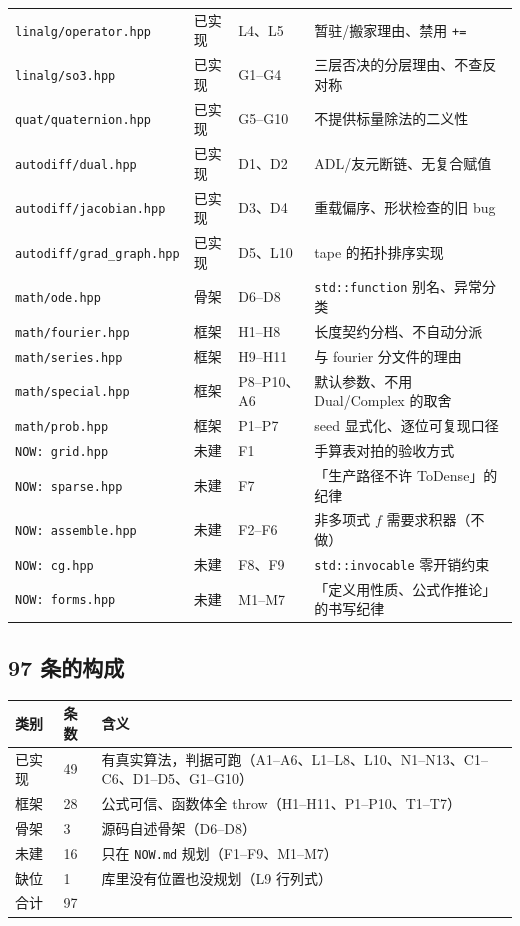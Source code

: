 \begin{longtable}{L{4.8cm}L{1.2cm}L{2.7cm}L{5.2cm}}
\texttt{linalg/operator.hpp} & 已实现 & L4、L5 & 暂驻/搬家理由、禁用 \texttt{+=} \\
\texttt{linalg/so3.hpp} & 已实现 & G1--G4 & 三层否决的分层理由、不查反对称 \\
\texttt{quat/quaternion.hpp} & 已实现 & G5--G10 & 不提供标量除法的二义性 \\
\texttt{autodiff/dual.hpp} & 已实现 & D1、D2 & ADL/友元断链、无复合赋值 \\
\texttt{autodiff/jacobian.hpp} & 已实现 & D3、D4 & 重载偏序、形状检查的旧 bug \\
\texttt{autodiff/grad\_graph.hpp} & 已实现 & D5、L10 & tape 的拓扑排序实现 \\
\texttt{math/ode.hpp} & 骨架 & D6--D8 & \texttt{std::function} 别名、异常分类 \\
\texttt{math/fourier.hpp} & 框架 & H1--H8 & 长度契约分档、不自动分派 \\
\texttt{math/series.hpp} & 框架 & H9--H11 & 与 fourier 分文件的理由 \\
\texttt{math/special.hpp} & 框架 & P8--P10、A6 & 默认参数、不用 Dual/Complex 的取舍 \\
\texttt{math/prob.hpp} & 框架 & P1--P7 & seed 显式化、逐位可复现口径 \\
\texttt{NOW: grid.hpp} & 未建 & F1 & 手算表对拍的验收方式 \\
\texttt{NOW: sparse.hpp} & 未建 & F7 & 「生产路径不许 ToDense」的纪律 \\
\texttt{NOW: assemble.hpp} & 未建 & F2--F6 & 非多项式 $f$ 需要求积器（不做） \\
\texttt{NOW: cg.hpp} & 未建 & F8、F9 & \texttt{std::invocable} 零开销约束 \\
\texttt{NOW: forms.hpp} & 未建 & M1--M7 & 「定义用性质、公式作推论」的书写纪律 \\
\bottomrule
\end{longtable}

\subsection{97 条的构成}

\begin{center}
\begin{tabular}{L{3.0cm}L{2.0cm}L{9.0cm}}
\toprule
类别 & 条数 & 含义 \\
\midrule
已实现 & 49 & 有真实算法，判据可跑（A1--A6、L1--L8、L10、N1--N13、C1--C6、D1--D5、G1--G10）\\
框架 & 28 & 公式可信、函数体全 throw（H1--H11、P1--P10、T1--T7）\\
骨架 & 3 & 源码自述骨架（D6--D8）\\
未建 & 16 & 只在 \texttt{NOW.md} 规划（F1--F9、M1--M7）\\
缺位 & 1 & 库里没有位置也没规划（L9 行列式）\\
\midrule
合计 & 97 & \\
\bottomrule
\end{tabular}
\end{center}

